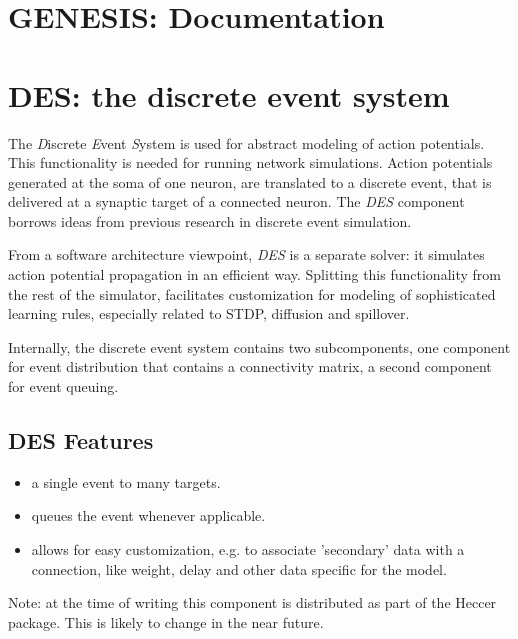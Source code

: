 \documentclass[12pt]{article}
\begin{document}
\section*{GENESIS: Documentation}

\section*{DES: the discrete event system}

The {\it D}iscrete {\it E}vent {\it S}ystem is used for abstract
modeling of action potentials. This functionality is needed for
running network simulations. Action potentials generated at the soma
of one neuron, are translated to a discrete event, that is delivered
at a synaptic target of a connected neuron. The {\it DES} component
borrows ideas from previous research in discrete event simulation.

From a software architecture viewpoint, {\it DES} is a separate
solver: it simulates action potential propagation in an efficient way.
Splitting this functionality from the rest of the simulator,
facilitates customization for modeling of sophisticated learning
rules, especially related to STDP, diffusion and spillover.

Internally, the discrete event system contains two subcomponents, one
component for event distribution that contains a connectivity matrix,
a second component for event queuing.

\subsection*{DES Features}

\begin{itemize}
\item a single event to many targets.
\item queues the event whenever applicable.
\item allows for easy customization, e.g. to associate 'secondary'
  data with a connection, like weight, delay and other data specific
  for the model.
\end{itemize}

Note: at the time of writing this component is distributed as part of the Heccer package. This is likely to change in the near future. 
\end{document}
